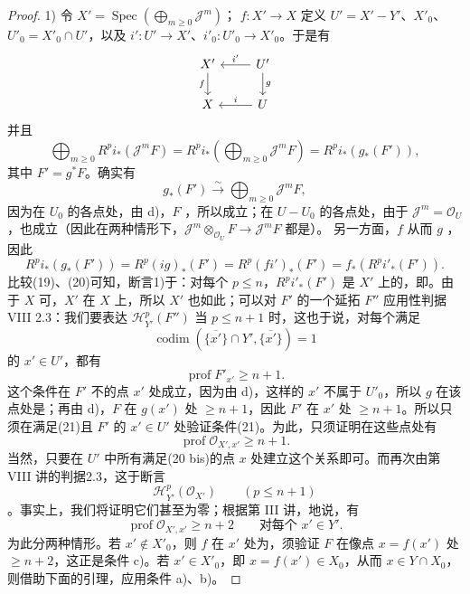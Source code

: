 \begin{proof}
1) 令 $X'=\operatorname{Spec}(\bigoplus_{m\geq0}\mathcal J^m)$； $f:X'\to X$ 定义 $U'=X'-Y'$、$X'_0$、$U'_0=X'_0\cap U'$，以及 $i':U'\to X'$、$i'_0:U'_0\to X'_0$。于是有
\[
\begin{tikzcd}
 X'\arrow[d,"f"'] & U'\arrow[l,"i'"']\arrow[d,"g"]\\
 X & U\arrow[l,"i"']
\end{tikzcd}
\]
并且
\[
 \bigoplus_{m\geq0}R^pi_*(\mathcal J^mF)
 =R^pi_*\left(\bigoplus_{m\geq0}\mathcal J^mF\right)
 =R^pi_*(g_*(F')),\tag{19}
\]
其中 $F'=g^*F$。确实有
\[
 g_*(F')\xrightarrow{\sim}\bigoplus_{m\geq0}\mathcal J^mF,
\]
因为在 $U_0$ 的各点处，由 d)，$F$ ，所以成立；在 $U-U_0$ 的各点处，由于 $\mathcal J^m=\mathcal O_U$，也成立（因此在两种情形下，$\mathcal J^m\otimes_{\mathcal O_U}F\to\mathcal J^mF$ 都是）。
另一方面，$f$ 从而 $g$ ，因此
\[
 R^pi_*(g_*(F'))=R^p(ig)_*(F')=R^p(fi')_*(F')=f_*(R^pi'_*(F')).\tag{20}
\]
比较(19)、(20)可知，断言1)于：对每个 $p\leq n$，$R^pi'_*(F')$ 是 $X'$ 上的，即。由于 $X$ 可，$X'$ 在 $X$ 上，所以 $X'$ 也如此；可以对 $F'$ 的一个延拓 $F''$ 应用性判据 VIII 2.3：我们要表达 $\mathcal H^p_{Y'}(F'')$ 当 $p\leq n+1$ 时，这也于说，对每个满足
\[
 \operatorname{codim}(\overline{\{x'\}}\cap Y',\overline{\{x'\}})=1\tag{20 bis}
\]
的 $x'\in U'$，都有
\[
 \operatorname{prof}F'_{x'}\geq n+1.\tag{21}
\]
这个条件在 $F'$ 不的点 $x'$ 处成立，因为由 d)，这样的 $x'$ 不属于 $U'_0$，所以 $g$ 在该点处是；再由 d)，$F$ 在 $g(x')$ 处 $\geq n+1$，因此 $F'$ 在 $x'$ 处 $\geq n+1$。所以只须在满足(21)且 $F'$ 的 $x'\in U'$ 处验证条件(21)。为此，只须证明在这些点处有
\[
 \operatorname{prof}\mathcal O_{X',x'}\geq n+1.\tag{21 bis}
\]
当然，只要在 $U'$ 中所有满足(20 bis)的点 $x$ 处建立这个关系即可。而再次由第 VIII 讲的判据2.3，这于断言
\[
 \mathcal H^p_{Y'}(\mathcal O_{X'})\qquad(p\leq n+1)
\]
。事实上，我们将证明它们甚至为零；根据第 III 讲，地说，有
\[
 \operatorname{prof}\mathcal O_{X',x'}\geq n+2\qquad\text{对每个 }x'\in Y'.\tag{22}
\]
为此分两种情形。若 $x'\notin X'_0$，则 $f$ 在 $x'$ 处为，须验证 $F$ 在像点 $x=f(x')$ 处 $\geq n+2$，这正是条件 c)。若 $x'\in X'_0$，即 $x=f(x')\in X_0$，从而 $x\in Y\cap X_0$，则借助下面的引理，应用条件 a)、b)。
\end{proof}
